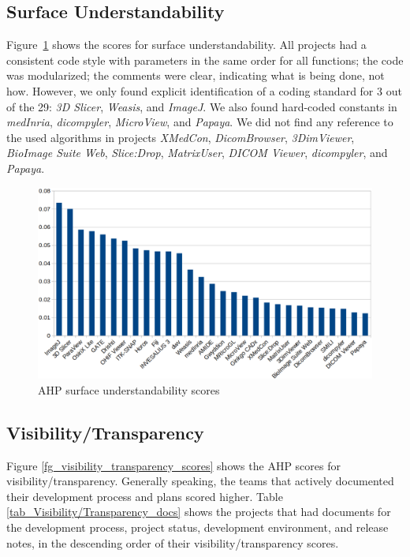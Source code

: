 \documentclass[final, 3p, times, authoryear]{elsarticle}
\begin{document}
\subsection{Surface Understandability} \label{sec_result_understandability}

Figure~\ref{fg_surface_understandability_scores} shows the scores for surface
understandability. All projects had a consistent code style with parameters in
the same order for all functions; the code was modularized; the comments were
clear, indicating what is being done, not how. However, we only found explicit
identification of a coding standard for 3 out of the 29: \textit{3D Slicer},
\textit{Weasis}, and \textit{ImageJ}. We also found hard-coded constants in
\textit{medInria}, \textit{dicompyler}, \textit{MicroView}, and \textit{Papaya}.
We did not find any reference to the used algorithms in projects
\textit{XMedCon}, \textit{DicomBrowser}, \textit{3DimViewer}, \textit{BioImage
Suite Web}, \textit{Slice:Drop}, \textit{MatrixUser}, \textit{DICOM Viewer},
\textit{dicompyler}, and \textit{Papaya}. 

\begin{figure}[!ht]
\includegraphics[scale=0.38]{figures/understandability_scores.png}
\caption{AHP surface understandability scores}
\label{fg_surface_understandability_scores}
\end{figure}

\subsection{Visibility/Transparency} \label{sec_result_visibility_transparency}

Figure \ref{fg_visibility_transparency_scores} shows the AHP scores for
visibility/transparency. Generally speaking, the teams that actively
documented their development process and plans scored higher. Table
\ref{tab_Visibility/Transparency_docs} shows the projects that had documents for
the development process, project status, development environment, and release
notes, in the descending order of their visibility/transparency scores.
\end{document}
